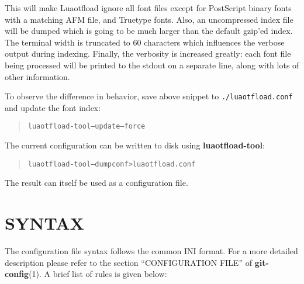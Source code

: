 \documentclass[a4paper]{article}
\begin{document}
This will make Luaotfload ignore all font files except for PostScript
binary fonts with a matching AFM file, and Truetype fonts. Also, an
uncompressed index file will be dumped which is going to be much larger
than the default gzip’ed index. The terminal width
is truncated to 60 characters which influences the verbose output
during indexing. Finally, the verbosity is increased greatly: each font
file being processed will be printed to the stdout on a separate line,
along with lots of other information.

To observe the difference in behavior, save above snippet to
\texttt{./luaotfload.conf} and update the font index:

\begin{quote}
\begin{alltt}
luaotfload-tool --update --force
\end{alltt}
\end{quote}

The current configuration can be written to disk using
\textbf{luaotfload-tool}:

\begin{quote}
\begin{alltt}
luaotfload-tool --dumpconf > luaotfload.conf
\end{alltt}
\end{quote}

The result can itself be used as a configuration file.


\section{SYNTAX%
  \label{syntax}%
}

The configuration file syntax follows the common INI format. For a more
detailed description please refer to the section “CONFIGURATION FILE”
of \textbf{git-config}(1). A brief list of rules is given below:
\end{document}
